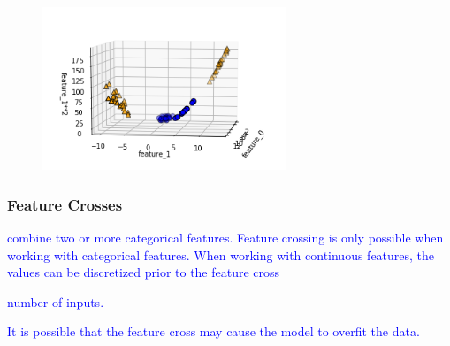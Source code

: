 \begin{figure}
\centering
\includegraphics[width=0.65\textwidth]{./sync_imgs/kernelized/2class4clust/3dimg.png}
\label{fig:kernelized_2class4clust_3dimg}
\end{figure}


\subsubsection{Feature Crosses}


\textcolor{blue}{combine two or more categorical features. Feature crossing is only possible when working with categorical features. When working with continuous features, the values can be discretized prior to the feature cross}



\textcolor{blue}{number of inputs.}

\textcolor{blue}{It is possible that the feature cross may cause the model to overfit the data.}


